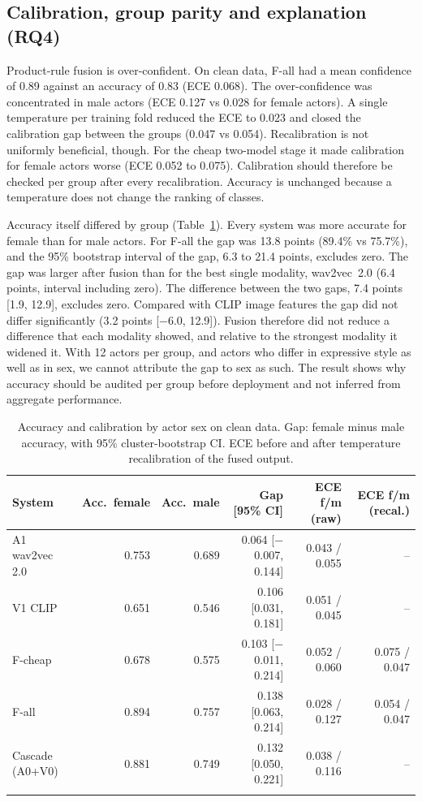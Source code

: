 \subsection{Calibration, group parity and explanation (RQ4)}

Product-rule fusion is over-confident. On clean data, F-all had a mean confidence of 0.89 against an accuracy of 0.83 (ECE 0.068). The over-confidence was concentrated in male actors (ECE 0.127 vs 0.028 for female actors). A single temperature per training fold reduced the ECE to 0.023 and closed the calibration gap between the groups (0.047 vs 0.054). Recalibration is not uniformly beneficial, though. For the cheap two-model stage it made calibration for female actors worse (ECE 0.052 to 0.075). Calibration should therefore be checked per group after every recalibration. Accuracy is unchanged because a temperature does not change the ranking of classes.

Accuracy itself differed by group (Table~\ref{tab:fair}). Every system was more accurate for female than for male actors. For F-all the gap was 13.8 points (89.4\% vs 75.7\%), and the 95\% bootstrap interval of the gap, 6.3 to 21.4 points, excludes zero. The gap was larger after fusion than for the best single modality, wav2vec~2.0 (6.4 points, interval including zero). The difference between the two gaps, 7.4 points [1.9, 12.9], excludes zero. Compared with CLIP image features the gap did not differ significantly (3.2 points [$-$6.0, 12.9]). Fusion therefore did not reduce a difference that each modality showed, and relative to the strongest modality it widened it. With 12 actors per group, and actors who differ in expressive style as well as in sex, we cannot attribute the gap to sex as such. The result shows why accuracy should be audited per group before deployment and not inferred from aggregate performance.

\begin{table}[t]
\setlength{\tabcolsep}{4pt}
\caption{Accuracy and calibration by actor sex on clean data. Gap: female minus male accuracy, with 95\% cluster-bootstrap CI. ECE before and after temperature recalibration of the fused output.}\label{tab:fair}
\centering\footnotesize
\begin{tabular}{@{}lrrrrr@{}}
\toprule
System & Acc.\ female & Acc.\ male & Gap [95\% CI] & ECE f/m (raw) & ECE f/m (recal.) \\
\midrule
A1 wav2vec 2.0 & 0.753 & 0.689 & 0.064 [$-$0.007, 0.144] & 0.043 / 0.055 & -- \\
V1 CLIP & 0.651 & 0.546 & 0.106 [0.031, 0.181] & 0.051 / 0.045 & -- \\
F-cheap & 0.678 & 0.575 & 0.103 [$-$0.011, 0.214] & 0.052 / 0.060 & 0.075 / 0.047 \\
F-all & 0.894 & 0.757 & 0.138 [0.063, 0.214] & 0.028 / 0.127 & 0.054 / 0.047 \\
Cascade (A0+V0) & 0.881 & 0.749 & 0.132 [0.050, 0.221] & 0.038 / 0.116 & -- \\
\botrule
\end{tabular}
\end{table}

